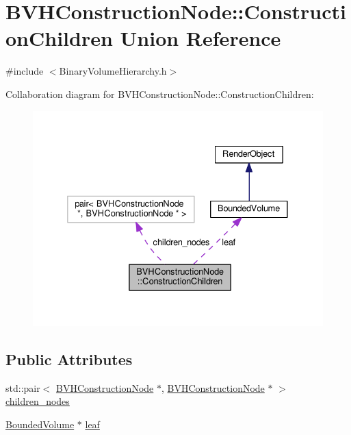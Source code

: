 \hypertarget{unionBVHConstructionNode_1_1ConstructionChildren}{}\section{B\+V\+H\+Construction\+Node\+:\+:Construction\+Children Union Reference}
\label{unionBVHConstructionNode_1_1ConstructionChildren}


{\ttfamily \#include $<$Binary\+Volume\+Hierarchy.\+h$>$}



Collaboration diagram for B\+V\+H\+Construction\+Node\+:\+:Construction\+Children\+:\nopagebreak
\begin{figure}[H]
\begin{center}
\leavevmode
\includegraphics[width=332pt]{unionBVHConstructionNode_1_1ConstructionChildren__coll__graph}
\end{center}
\end{figure}
\subsection*{Public Attributes}
\begin{DoxyCompactItemize}
\item 
std\+::pair$<$ \hyperlink{structBVHConstructionNode}{B\+V\+H\+Construction\+Node} $\ast$, \hyperlink{structBVHConstructionNode}{B\+V\+H\+Construction\+Node} $\ast$ $>$ \hyperlink{unionBVHConstructionNode_1_1ConstructionChildren_ac5e7d56943ed00d7165259481d7cb005}{children\+\_\+nodes}
\item 
\hyperlink{classBoundedVolume}{Bounded\+Volume} $\ast$ \hyperlink{unionBVHConstructionNode_1_1ConstructionChildren_abd717eefbb1140cd74ab66c49771b728}{leaf}
\end{DoxyCompactItemize}


